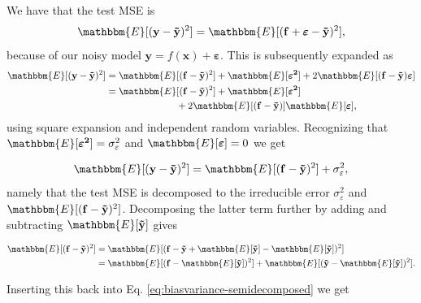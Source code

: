 \documentclass[norsk,a4paper,12pt]{article}
\begin{document}
\begin{multicols}{2}
We have that the test MSE is
\begin{equation*}
    \mathbbm{E}[(\mathbf{y} - \mathbf{\tilde{y}})^2] = \mathbbm{E}[(\mathbf{f} + \boldsymbol{\varepsilon} - \mathbf{\tilde{y}})^2], 
\end{equation*}
because of our noisy model $\mathbf{y} = f(\mathbf{x}) + \boldsymbol{\varepsilon}$. This is subsequently expanded as
\begin{equation*}
\begin{split}
    \mathbbm{E}[(\mathbf{y} - \mathbf{\tilde{y}})^2] & = \mathbbm{E}[(\mathbf{f} - \mathbf{\tilde{y}})^2] + \mathbbm{E}[\boldsymbol{\varepsilon^2}] + 2\mathbbm{E}[(\mathbf{f} - \mathbf{\tilde{y}})\boldsymbol{\varepsilon}] \\
    & = \mathbbm{E}[(\mathbf{f} - \mathbf{\tilde{y}})^2] + \mathbbm{E}[\boldsymbol{\varepsilon^2}] \\ & \hspace{2.565cm} + 2\mathbbm{E}[(\mathbf{f} - \mathbf{\tilde{y}})]\mathbbm{E}[\boldsymbol{\varepsilon}],
\end{split}
\end{equation*}
using square expansion and independent random variables. Recognizing that $\mathbbm{E}[\boldsymbol{\varepsilon^2}] = \sigma_{\varepsilon}^2$ and $\mathbbm{E}[\boldsymbol{\varepsilon}] = 0$ we get

\begin{equation}
    \mathbbm{E}[(\mathbf{y} - \mathbf{\tilde{y}})^2] = \mathbbm{E}[(\mathbf{f} - \mathbf{\tilde{y}})^2] + \sigma_{\varepsilon}^2 ,
\label{eq:biasvariance-semidecomposed}
\end{equation}
namely that the test MSE is decomposed to the irreducible error $\sigma_{\varepsilon}^2$ and $\mathbbm{E}[(\mathbf{f} - \mathbf{\tilde{y}})^2]$. Decomposing the latter term further by adding and subtracting $\mathbbm{E}[\mathbf{\tilde{y}}]$ gives

\begin{equation*}
\begin{split}
 \mathbbm{E}[(\mathbf{f} - \mathbf{\tilde{y}})^2] & = \mathbbm{E}[(\mathbf{f} - \mathbf{\tilde{y}} + \mathbbm{E}[\mathbf{\tilde{y}}] - \mathbbm{E}[\mathbf{\tilde{y}}])^2] \\
 & = \mathbbm{E}[(\mathbf{f} - \mathbbm{E}[\mathbf{\tilde{y}}])^2] + \mathbbm{E}[(\mathbf{\tilde{y}} - \mathbbm{E}[\mathbf{\tilde{y}}])^2] .
\end{split}
\end{equation*}

Inserting this back into Eq. \ref{eq:biasvariance-semidecomposed} we get


\end{multicols}
\end{document}
